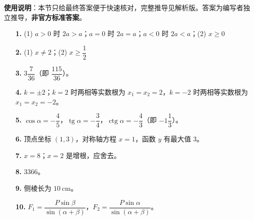 
\begin{gknotice}
\textbf{使用说明}：本节只给最终答案便于快速核对，完整推导见解析版。答案为编写者独立推导，\textbf{非官方标准答案}。
\end{gknotice}

\begin{itemize}[leftmargin=2.6em]
  \item[\textbf{1.}] (1) $a>0$ 时 $2a>a$；$a=0$ 时 $2a=a$；$a<0$ 时 $2a<a$；(2) $x\ge 0$
  \item[\textbf{2.}] (1) $x\ne 2$；(2) $x\ge\dfrac{1}{2}$
  \item[\textbf{3.}] $3\dfrac{7}{36}$（即 $\dfrac{115}{36}$）。
  \item[\textbf{4.}] $k=\pm 2$；$k=2$ 时两相等实数根为 $x_1=x_2=2$，$k=-2$ 时两相等实数根为 $x_1=x_2=-2$。
  \item[\textbf{5.}] $\cos\alpha=-\dfrac{4}{5}$，$\operatorname{tg}\alpha=-\dfrac{3}{4}$，$\operatorname{ctg}\alpha=-\dfrac{4}{3}$（即 $-1\dfrac{1}{3}$）。
  \item[\textbf{6.}] 顶点坐标 $(1,3)$，对称轴方程 $x=1$，函数 $y$ 有最大值 $3$。
  \item[\textbf{7.}] $x=8$；$x=2$ 是增根，应舍去。
  \item[\textbf{8.}] $3366$。
  \item[\textbf{9.}] 侧棱长为 $10\ \mathrm{cm}$。
  \item[\textbf{10.}] $F_1=\dfrac{P\sin\beta}{\sin(\alpha+\beta)}$，$F_2=\dfrac{P\sin\alpha}{\sin(\alpha+\beta)}$。
\end{itemize}
